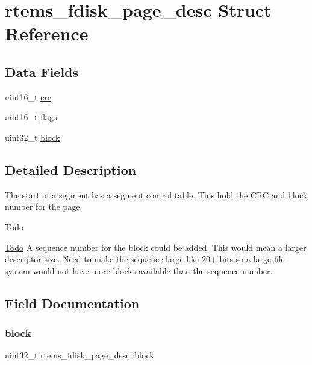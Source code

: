 \hypertarget{structrtems__fdisk__page__desc}{}\section{rtems\+\_\+fdisk\+\_\+page\+\_\+desc Struct Reference}
\label{structrtems__fdisk__page__desc}
\subsection*{Data Fields}
\begin{DoxyCompactItemize}
\item 
uint16\+\_\+t \mbox{\hyperlink{structrtems__fdisk__page__desc_ab536a8971dc1689be4f48d2a4b501211}{crc}}
\item 
uint16\+\_\+t \mbox{\hyperlink{structrtems__fdisk__page__desc_a9e97ebc43a3bd8d3b5c6e091a2954ec5}{flags}}
\item 
uint32\+\_\+t \mbox{\hyperlink{structrtems__fdisk__page__desc_a16a45d806a5082d78541115cbbd6afbf}{block}}
\end{DoxyCompactItemize}


\subsection{Detailed Description}
The start of a segment has a segment control table. This hold the C\+RC and block number for the page.

\begin{DoxyRefDesc}{Todo}
\item[\mbox{\hyperlink{todo__todo000009}{Todo}}]A sequence number for the block could be added. This would mean a larger descriptor size. Need to make the sequence large like 20+ bits so a large file system would not have more blocks available than the sequence number. \end{DoxyRefDesc}


\subsection{Field Documentation}
\mbox{\label{structrtems__fdisk__page__desc_a16a45d806a5082d78541115cbbd6afbf}} 
\subsubsection{\texorpdfstring{block}{block}}
{\footnotesize\ttfamily uint32\+\_\+t rtems\+\_\+fdisk\+\_\+page\+\_\+desc\+::block}

